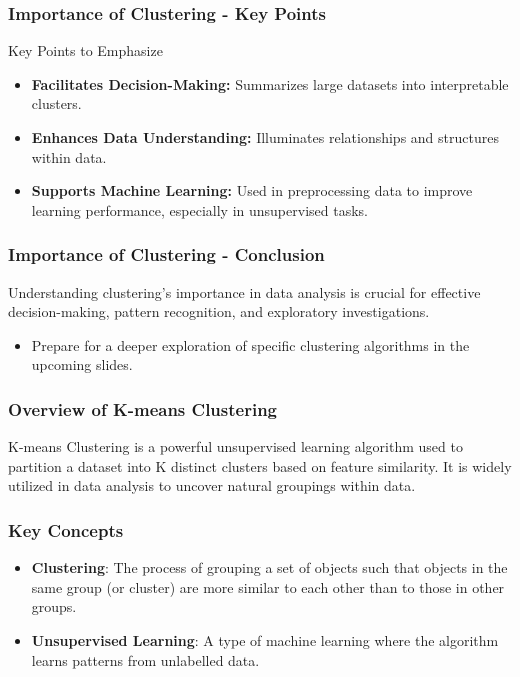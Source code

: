 \documentclass[aspectratio=169]{beamer}
\begin{document}
\begin{frame}[fragile]
    \frametitle{Importance of Clustering - Key Points}
    \begin{block}{Key Points to Emphasize}
        \begin{itemize}
            \item \textbf{Facilitates Decision-Making:} Summarizes large datasets into interpretable clusters.
            \item \textbf{Enhances Data Understanding:} Illuminates relationships and structures within data.
            \item \textbf{Supports Machine Learning:} Used in preprocessing data to improve learning performance, especially in unsupervised tasks.
        \end{itemize}
    \end{block}
\end{frame}

\begin{frame}[fragile]
    \frametitle{Importance of Clustering - Conclusion}
    Understanding clustering's importance in data analysis is crucial for effective decision-making, pattern recognition, and exploratory investigations. 
    \begin{itemize}
        \item Prepare for a deeper exploration of specific clustering algorithms in the upcoming slides.
    \end{itemize}
\end{frame}

\begin{frame}[fragile]
    \titlepage
\end{frame}

\begin{frame}[fragile]
    \frametitle{Overview of K-means Clustering}
    K-means Clustering is a powerful unsupervised learning algorithm used to partition a dataset into K distinct clusters based on feature similarity. It is widely utilized in data analysis to uncover natural groupings within data.
\end{frame}

\begin{frame}[fragile]
    \frametitle{Key Concepts}
    \begin{itemize}
        \item \textbf{Clustering}: The process of grouping a set of objects such that objects in the same group (or cluster) are more similar to each other than to those in other groups.
        \item \textbf{Unsupervised Learning}: A type of machine learning where the algorithm learns patterns from unlabelled data.
    \end{itemize}
\end{frame}
\end{document}
